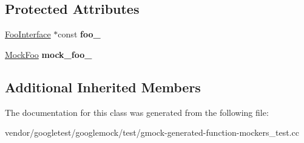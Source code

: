 \subsection*{Protected Attributes}
\begin{DoxyCompactItemize}
\item 
\mbox{\label{classtesting_1_1gmock__generated__function__mockers__test_1_1_function_mocker_test_ae2b8b577c4808f2dff9797168468f65f}} 
\hyperlink{classtesting_1_1gmock__generated__function__mockers__test_1_1_foo_interface}{Foo\+Interface} $\ast$const {\bfseries foo\+\_\+}
\item 
\mbox{\label{classtesting_1_1gmock__generated__function__mockers__test_1_1_function_mocker_test_a265659f07a0e75152ab295add4769585}} 
\hyperlink{classtesting_1_1gmock__generated__function__mockers__test_1_1_mock_foo}{Mock\+Foo} {\bfseries mock\+\_\+foo\+\_\+}
\end{DoxyCompactItemize}
\subsection*{Additional Inherited Members}


The documentation for this class was generated from the following file\+:\begin{DoxyCompactItemize}
\item 
vendor/googletest/googlemock/test/gmock-\/generated-\/function-\/mockers\+\_\+test.\+cc\end{DoxyCompactItemize}
